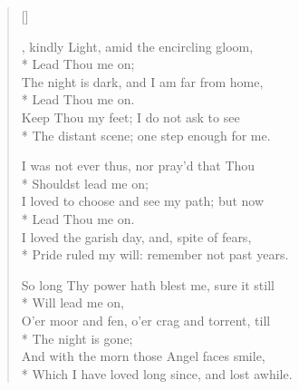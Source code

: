 \newHymn

\settowidth{\versewidth}{Lead, kindly Light, amid the encircling gloom}

\begin{verse}[\versewidth]
\begin{patverse}
, kindly Light, amid the encircling gloom,\\*
Lead Thou me on;\\
The night is dark, and I am far from home,\\*
Lead Thou me on.\\
Keep Thou my feet; I do not ask to see\\*
The distant scene; one step enough for me.
\end{patverse}

\begin{patverse}
I was not ever thus, nor pray'd that Thou\\*
Shouldst lead me on;\\
I loved to choose and see my path; but now\\*
Lead Thou me on.\\
I loved the garish day, and, spite of fears,\\*
Pride ruled my will: remember not past years.
\end{patverse}


\begin{patverse}
So long Thy power hath blest me, sure it still\\*
Will lead me on,\\
O'er moor and fen, o'er crag and torrent, till\\*
The night is gone;\\
And with the morn those Angel faces smile,\\*
Which I have loved long since, and lost awhile.
\end{patverse}


\end{verse}


